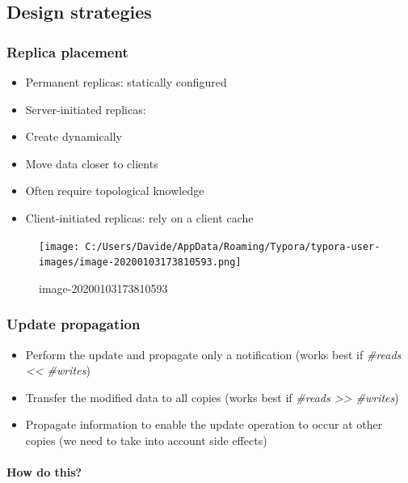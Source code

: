 \subsection{Design strategies}\label{design-strategies}

\subsubsection{Replica placement}\label{replica-placement}

\begin{itemize}
\itemsep1pt\parskip0pt
\item
  Permanent replicas: statically configured
\item
  Server-initiated replicas:
\item
  Create dynamically
\item
  Move data closer to clients
\item
  Often require topological knowledge
\item
  Client-initiated replicas: rely on a client cache
\end{itemize}

\begin{figure}[htbp]
\centering
\texttt{[image: C:/Users/Davide/AppData/Roaming/Typora/typora-user-images/image-20200103173810593.png]}
\caption{image-20200103173810593}
\end{figure}

\subsubsection{Update propagation}\label{update-propagation}

\begin{itemize}
\itemsep1pt\parskip0pt
\item
  Perform the update and propagate only a notification (works best if
  \emph{\#reads \textless{}\textless{} \#writes})
\item
  Transfer the modified data to all copies (works best if \emph{\#reads
  \textgreater{}\textgreater{} \#writes})
\item
  Propagate information to enable the update operation to occur at other
  copies (we need to take into account side effects)
\end{itemize}

\paragraph{How do this?}\label{how-do-this}

